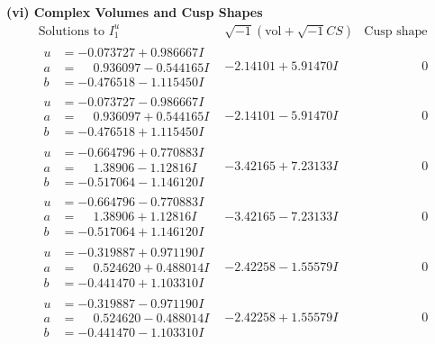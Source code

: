 \documentclass[1p]{elsarticle_modified}
\theoremstyle{definition}
\newcommand{\I}{\sqrt{-1}}
\begin{document}
\newpage\flushleft \textbf{(vi) Complex Volumes and Cusp Shapes}
$$\begin{array}{c|c|c}  
\text{Solutions to }I^u_{1}& \I (\text{vol} + \sqrt{-1}CS) & \text{Cusp shape}\\
 \hline 
\begin{aligned}
u &= -0.073727 + 0.986667 I \\
a &= \phantom{-}0.936097 - 0.544165 I \\
b &= -0.476518 - 1.115450 I\end{aligned}
 & -2.14101 + 5.91470 I & \phantom{-0.000000 } 0 \\ \hline\begin{aligned}
u &= -0.073727 - 0.986667 I \\
a &= \phantom{-}0.936097 + 0.544165 I \\
b &= -0.476518 + 1.115450 I\end{aligned}
 & -2.14101 - 5.91470 I & \phantom{-0.000000 } 0 \\ \hline\begin{aligned}
u &= -0.664796 + 0.770883 I \\
a &= \phantom{-}1.38906 - 1.12816 I \\
b &= -0.517064 - 1.146120 I\end{aligned}
 & -3.42165 + 7.23133 I & \phantom{-0.000000 } 0 \\ \hline\begin{aligned}
u &= -0.664796 - 0.770883 I \\
a &= \phantom{-}1.38906 + 1.12816 I \\
b &= -0.517064 + 1.146120 I\end{aligned}
 & -3.42165 - 7.23133 I & \phantom{-0.000000 } 0 \\ \hline\begin{aligned}
u &= -0.319887 + 0.971190 I \\
a &= \phantom{-}0.524620 + 0.488014 I \\
b &= -0.441470 + 1.103310 I\end{aligned}
 & -2.42258 - 1.55579 I & \phantom{-0.000000 } 0 \\ \hline\begin{aligned}
u &= -0.319887 - 0.971190 I \\
a &= \phantom{-}0.524620 - 0.488014 I \\
b &= -0.441470 - 1.103310 I\end{aligned}
 & -2.42258 + 1.55579 I & \phantom{-0.000000 } 0 \\ \hline\begin{aligned}

\end{aligned}
\end{array}$$
\end{document}
